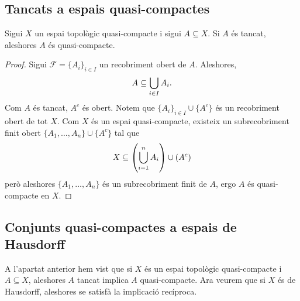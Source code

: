 \documentclass[../main.tex]{subfiles}
\begin{document}
\subsection{Tancats a espais quasi-compactes}

\begin{prop}
\label{prop:tancatesqc} Sigui $X$ un espai topològic quasi-compacte i sigui $A\subseteq X$. Si $A$ és tancat, aleshores $A$ és quasi-compacte.
\end{prop}
\begin{proof}
Sigui $\mathcal{F} = \{A_i\}_{i\in I}$ un recobriment obert de $A$. Aleshores,
\begin{equation}
    \notag
    A\subseteq \bigcup_{i\in I} A_i.
\end{equation}
Com $A$ és tancat, $A^c$ és obert. Notem que $\{A_i\}_{i\in I}\cup\{A^c\}$ és un recobriment obert de tot $X$. Com $X$ és un espai quasi-compacte, existeix un subrecobriment finit obert $\{A_1,\ldots,A_n\}\cup\{A^c\}$ tal que
\begin{equation}
    \notag
    X\subseteq\left(\bigcup_{i=1}^n A_i\right)\cup(A^c)
\end{equation}
però aleshores $\{A_1,\ldots,A_n\}$ és un subrecobriment finit de $A$, ergo $A$ és quasi-compacte en $X$.
\end{proof}

\subsection{Conjunts quasi-compactes a espais de Hausdorff}

A l'apartat anterior hem vist que si $X$ és un espai topològic quasi-compacte i $A\subseteq X$, aleshores $A$ tancat implica $A$ quasi-compacte. Ara veurem que si $X$ és de Hausdorff, aleshores se satisfà la implicació recíproca.
\end{document}
